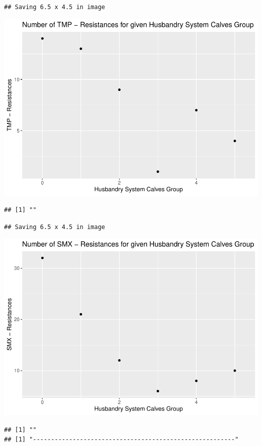 \documentclass[
]{article}
\begin{document}
\begin{verbatim}
## Saving 6.5 x 4.5 in image
\end{verbatim}

\includegraphics{NResistenzen_files/figure-latex/binary_or_nominal_variables-39.pdf}

\begin{verbatim}
## [1] ""
\end{verbatim}

\begin{verbatim}
## Saving 6.5 x 4.5 in image
\end{verbatim}

\includegraphics{NResistenzen_files/figure-latex/binary_or_nominal_variables-40.pdf}

\begin{verbatim}
## [1] ""
## [1] "--------------------------------------------------------"
\end{verbatim}
\end{document}
